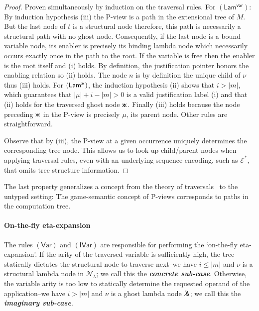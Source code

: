 \documentclass[xchauthor,chkrefs,GCNS,amsmath,amsthm,rotating,leaveRGB]{tcsg}
\renewcommand{\index}[1]{}
\theoremstyle{plain}
\theoremstyle{definition}
\newcommand{\Nodes}{\mathcal{N}}
\newcommand{\NodesLmd}{\Nodes_\lambda}
\newcommand{\ghostlmd}{{\lambda\mkern-7mu \lambda}}
\newcommand{\ghostvar}{\mathsf{x\mkern-5mu x}}
\begin{document}
\begin{proof}
Proven simultaneously by induction on the traversal rules. For
$\mathsf{(Lam^{\mathsf{var}})}$: By induction hypothesis (iii) the P-view is
a path in the extensional tree of $M$. But the last node of $t$ is a
structural node therefore, this path is necessarily a structural path with no
ghost node. Consequently, if the last node is a bound variable node, its
enabler is precisely its binding lambda node which necessarily occurs exactly
once in the path to the root. If the variable is free then the enabler is the
root itself and (i) holds. By definition, the justification pointer honors
the enabling relation so (ii) holds. The node $n$ is by definition the unique
child of $\nu $ thus (iii) holds. For $\mathsf{(Lam^{\ghostvar}  )}$, the
induction hypothesis (ii) shows that $i>|m|$, which guarantees that $|\mu
|+i-|m|>0$ is a valid justification label (i) and that (ii) holds for the
traversed ghost node $\ghostvar $. Finally (iii) holds because the node
preceding $\ghostvar $ in the P-view is precisely $\mu $, its parent node.
Other rules are straightforward.

Observe that by (iii), the P-view at a given occurrence uniquely determines
the corresponding tree node. This allows us to look up child/parent nodes
when applying traversal rules, even with an underlying sequence encoding,
such as $\mathcal{E}^{*}$, that omits tree structure information.
\end{proof}

The last property generalizes a concept from the theory of
traversals~\cite{OngLics2006,BlumPhd} to the untyped setting: The
game-semantic concept of P-views corresponds to paths in the computation
tree.

\paragraph*{On-the-fly eta-expansion}
The rules $\mathsf{(Var)}$ and $\mathsf{(IVar)}$ are responsible for
performing the `on-the-fly eta-expansion'. If the arity of the traversed
variable is sufficiently high, the tree statically dictates the structural
node to traverse next--we have $i \leq |m|$ and $\nu $ is a structural lambda
node in $\NodesLmd $; we call this the \textbf{\emph{concrete
sub-case}}\index{concrete sub-case}. Otherwise, the variable arity is too low
to statically determine the requested operand of the application--we have $i
> |m|$ and $\nu $ is a ghost lambda node $\ghostlmd $; we call this the
\textbf{\emph{imaginary sub-case}}\index{imaginary sub-case}.
\end{document}
